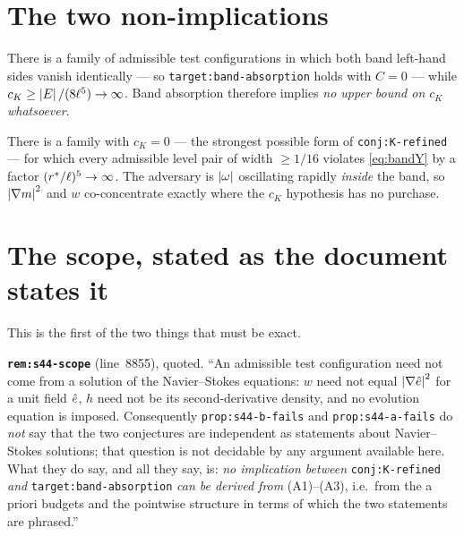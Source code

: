 \section{The two non-implications}
\label{sec:counterexamples}

\begin{statement}
\label{st:bfails}
There is a family of admissible test configurations in which both band
left-hand sides vanish identically --- so
\texttt{target:band-absorption} holds with \(C=0\) --- while
\(c_K\ge\left|E\right|/(8\ell^5)\to\infty\). Band absorption therefore implies
\emph{no upper bound on \(c_K\) whatsoever}.
\end{statement}

\begin{statement}
\label{st:afails}
There is a family with \(c_K=0\) --- the strongest possible form of
\texttt{conj:K-refined} --- for which every admissible level pair of width
\(\ge1/16\) violates \eqref{eq:bandY} by a factor \((r^{*}/\ell)^5\to\infty\).
The adversary is \(\left|\omega\right|\) oscillating rapidly \emph{inside} the band,
so \(\left|\nabla m\right|^2\) and \(w\) co-concentrate exactly where the \(c_K\)
hypothesis has no purchase.
\end{statement}

\section{The scope, stated as the document states it}
\label{sec:s44-scope}

This is the first of the two things that must be exact.

\begin{record}
\textbf{\texttt{rem:s44-scope}} (line~8855), quoted. ``An admissible test
configuration need not come from a solution of the Navier--Stokes equations:
\(w\) need not equal \(\left|\nabla\hat{e}\right|^2\) for a unit field \(\hat{e}\), \(h\)
need not be its second-derivative density, and no evolution equation is
imposed. Consequently \texttt{prop:s44-b-fails} and \texttt{prop:s44-a-fails}
do \emph{not} say that the two conjectures are independent as statements about
Navier--Stokes solutions; that question is not decidable by any argument
available here. What they do say, and all they say, is: \emph{no implication
between} \texttt{conj:K-refined} \emph{and} \texttt{target:band-absorption}
\emph{can be derived from} (A1)--(A3), i.e.\ from the a priori budgets and the
pointwise structure in terms of which the two statements are phrased.''
\end{record}

